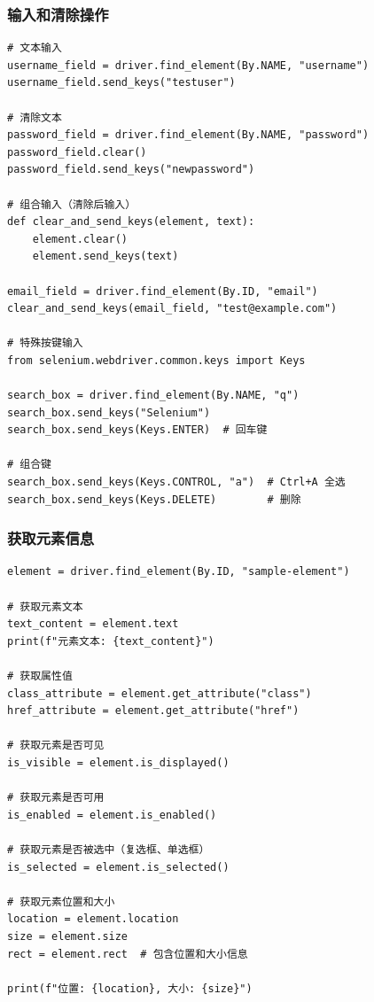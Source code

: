 \subsubsection{输入和清除操作}

\begin{lstlisting}[style=demostyle,numbers=none]
# 文本输入
username_field = driver.find_element(By.NAME, "username")
username_field.send_keys("testuser")

# 清除文本
password_field = driver.find_element(By.NAME, "password")
password_field.clear()
password_field.send_keys("newpassword")

# 组合输入（清除后输入）
def clear_and_send_keys(element, text):
    element.clear()
    element.send_keys(text)

email_field = driver.find_element(By.ID, "email")
clear_and_send_keys(email_field, "test@example.com")

# 特殊按键输入
from selenium.webdriver.common.keys import Keys

search_box = driver.find_element(By.NAME, "q")
search_box.send_keys("Selenium")
search_box.send_keys(Keys.ENTER)  # 回车键

# 组合键
search_box.send_keys(Keys.CONTROL, "a")  # Ctrl+A 全选
search_box.send_keys(Keys.DELETE)        # 删除
\end{lstlisting}

\subsubsection{获取元素信息}

\begin{lstlisting}[style=demostyle,numbers=none]
element = driver.find_element(By.ID, "sample-element")

# 获取元素文本
text_content = element.text
print(f"元素文本: {text_content}")

# 获取属性值
class_attribute = element.get_attribute("class")
href_attribute = element.get_attribute("href")

# 获取元素是否可见
is_visible = element.is_displayed()

# 获取元素是否可用
is_enabled = element.is_enabled()

# 获取元素是否被选中（复选框、单选框）
is_selected = element.is_selected()

# 获取元素位置和大小
location = element.location
size = element.size
rect = element.rect  # 包含位置和大小信息

print(f"位置: {location}, 大小: {size}")
\end{lstlisting}

